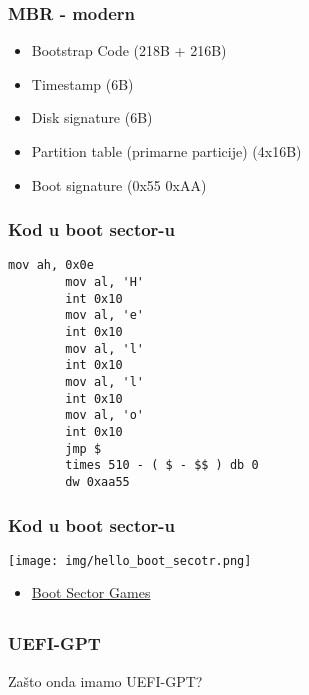 \documentclass{beamer}
\begin{document}
\begin{frame}
    \frametitle{MBR - modern}
    \begin{itemize}
        \item Bootstrap Code (218B + 216B) \newline
        \item Timestamp (6B) \newline
        \item Disk signature (6B) \newline
        \item Partition table (primarne particije) (4x16B) \newline
        \item Boot signature (0x55 0xAA)
    \end{itemize}
\end{frame}

\begin{frame}[fragile]
    \frametitle{Kod u boot sector-u}
    \begin{lstlisting}[language={[x86masm]Assembler}]
        mov ah, 0x0e
        mov al, 'H'
        int 0x10
        mov al, 'e'
        int 0x10
        mov al, 'l'
        int 0x10
        mov al, 'l'
        int 0x10
        mov al, 'o'
        int 0x10
        jmp $ 
        times 510 - ( $ - $$ ) db 0
        dw 0xaa55

    \end{lstlisting}
\end{frame}

\begin{frame}
    \frametitle{Kod u boot sector-u}
    \begin{center}
        \texttt{[image: img/hello\_boot\_secotr.png]}
    \end{center}
    \begin{itemize}
        \item \href{https://youtu.be/1UzTf0Qo37A}{Boot Sector Games}
    \end{itemize}
\end{frame}

\subsection*{}

\begin{frame}
    \frametitle{UEFI-GPT}
    \begin{center}
        Zašto onda imamo UEFI-GPT?
    \end{center}
\end{frame}
\end{document}
